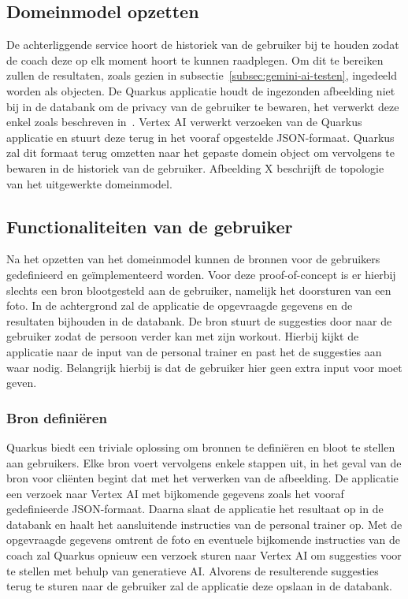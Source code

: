 \subsection{Domeinmodel opzetten}
\label{subsec:domeinmodel-opzetten}
De achterliggende service hoort de historiek van de gebruiker bij te houden zodat de coach deze op elk moment hoort te kunnen raadplegen.
Om dit te bereiken zullen de resultaten, zoals gezien in subsectie~\ref{subsec:gemini-ai-testen}, ingedeeld worden als objecten.
De Quarkus applicatie houdt de ingezonden afbeelding niet bij in de databank om de privacy van de gebruiker te bewaren, het verwerkt deze enkel zoals beschreven in~.
Vertex AI verwerkt verzoeken van de Quarkus applicatie en stuurt deze terug in het vooraf opgestelde JSON-formaat.
Quarkus zal dit formaat terug omzetten naar het gepaste domein object om vervolgens te bewaren in de historiek van de gebruiker.
Afbeelding X beschrijft de topologie van het uitgewerkte domeinmodel. %

\subsection{Functionaliteiten van de gebruiker}
\label{subsec:functionaliteiten-van-de-gebruiker}
Na het opzetten van het domeinmodel kunnen de bronnen voor de gebruikers gedefinieerd en geïmplementeerd worden.
Voor deze proof-of-concept is er hierbij slechts een bron blootgesteld aan de gebruiker, namelijk het doorsturen van een foto.
In de achtergrond zal de applicatie de opgevraagde gegevens en de resultaten bijhouden in de databank.
De bron stuurt de suggesties door naar de gebruiker zodat de persoon verder kan met zijn workout.
Hierbij kijkt de applicatie naar de input van de personal trainer en past het de suggesties aan waar nodig.
Belangrijk hierbij is dat de gebruiker hier geen extra input voor moet geven.

\subsubsection{Bron definiëren}
Quarkus biedt een triviale oplossing om bronnen te definiëren en bloot te stellen aan gebruikers.
Elke bron voert vervolgens enkele stappen uit, in het geval van de bron voor cliënten begint dat met het verwerken van de afbeelding.
De applicatie een verzoek naar Vertex AI met bijkomende gegevens zoals het vooraf gedefinieerde JSON-formaat.
Daarna slaat de applicatie het resultaat op in de databank en haalt het aansluitende instructies van de personal trainer op.
Met de opgevraagde gegevens omtrent de foto en eventuele bijkomende instructies van de coach zal Quarkus opnieuw een verzoek sturen naar Vertex AI om suggesties voor te stellen met behulp van generatieve AI.
Alvorens de resulterende suggesties terug te sturen naar de gebruiker zal de applicatie deze opslaan in de databank.

